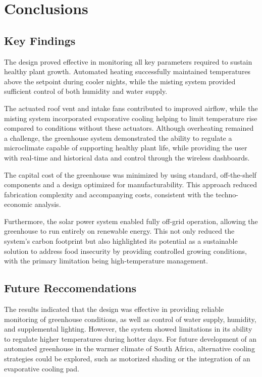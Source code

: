 \chapter{Conclusions}



\section*{Key Findings}

The design proved effective in monitoring all key parameters required to sustain healthy plant growth. Automated heating successfully maintained temperatures above the setpoint during cooler nights, while the misting system provided sufficient control of both humidity and water supply.

The actuated roof vent and intake fans contributed to improved airflow, while the misting system incorporated evaporative cooling helping to limit temperature rise compared to conditions without these actuators. Although overheating remained a challenge, the greenhouse system demonstrated the ability to regulate a microclimate capable of supporting healthy plant life, while providing the user with real-time and historical data and control through the wireless dashboards.

The capital cost of the greenhouse was minimized by using standard, off-the-shelf components and a design optimized for manufacturability. This approach reduced fabrication complexity and accompanying costs, consistent with the techno-economic analysis.

Furthermore, the solar power system enabled fully off-grid operation, allowing the greenhouse to run entirely on renewable energy. This not only reduced the system’s carbon footprint but also highlighted its potential as a sustainable solution to address food insecurity by providing controlled growing conditions, with the primary limitation being high-temperature management.

\section*{Future Reccomendations}

The results indicated that the design was effective in providing reliable monitoring of greenhouse conditions, as well as control of water supply, humidity, and supplemental lighting. However, the system showed limitations in its ability to regulate higher temperatures during hotter days. For future development of an automated greenhouse in the warmer climate of South Africa, alternative cooling strategies could be explored, such as motorized shading or the integration of an evaporative cooling pad.







